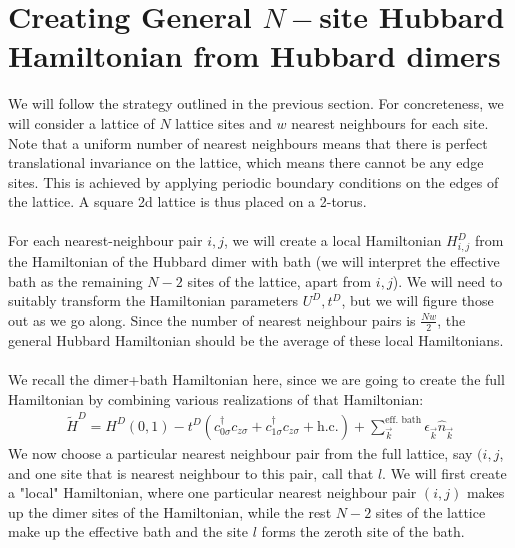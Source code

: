 \documentclass{article}
\numberwithin{equation}{section}
\begin{document}
\section{Creating General \(N-\)site Hubbard Hamiltonian from Hubbard dimers}
We will follow the strategy outlined in the previous section. For concreteness, we will consider a lattice of \(N\) lattice sites and \(w\) nearest neighbours for each site. Note that a uniform number of nearest neighbours means that there is perfect translational invariance on the lattice, which means there cannot be any edge sites. This is achieved by applying periodic boundary conditions on the edges of the lattice. A square 2d lattice is thus placed on a 2-torus.
\\\\
For each nearest-neighbour pair \(i,j\), we will create a local Hamiltonian \(H^D_{i,j}\) from the Hamiltonian of the Hubbard dimer with bath (we will interpret the effective bath as the remaining \(N-2\) sites of the lattice, apart from \(i,j\)). We will need to suitably transform the Hamiltonian parameters \(U^D, t^D\), but we will figure those out as we go along. Since the number of nearest neighbour pairs is \(\frac{Nw}{2}\), the general Hubbard Hamiltonian should be the average of these local Hamiltonians. 
\\\\
We recall the dimer+bath Hamiltonian here, since we are going to create the full Hamiltonian by combining various realizations of that Hamiltonian:
\begin{equation}\begin{aligned}
	\tilde H^D = H^D(0,1) - t^D \left(c^\dagger_{0\sigma}c_{z\sigma} + c^\dagger_{1\sigma}c_{z\sigma} + \text{h.c.}\right) + \sum_{\vec k}^\text{eff. bath}\epsilon_{\vec k}\hat n_{\vec k}
\end{aligned}\end{equation}
We now choose a particular nearest neighbour pair from the full lattice, say \((i,j\), and one site that is nearest neighbour to this pair, call that \(l\). We will first create a "local" Hamiltonian, where one particular nearest neighbour pair \((i,j)\) makes up the dimer sites of the Hamiltonian, while the rest \(N-2\) sites of the lattice make up the effective bath and the site \(l\) forms the zeroth site of the bath.
\end{document}
